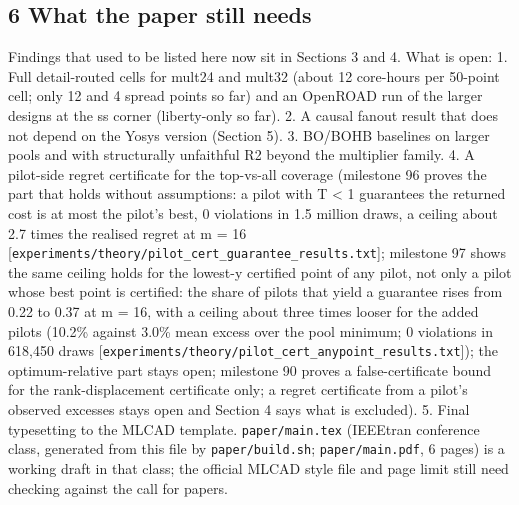 \documentclass[conference]{IEEEtran}
\begin{document}
\hypertarget{what-the-paper-still-needs}{%
\subsection{6 What the paper still
needs}\label{what-the-paper-still-needs}}

Findings that used to be listed here now sit in Sections 3 and 4. What
is open: 1. Full detail-routed cells for mult24 and mult32 (about 12
core-hours per 50-point cell; only 12 and 4 spread points so far) and an
OpenROAD run of the larger designs at the ss corner (liberty-only so
far). 2. A causal fanout result that does not depend on the Yosys
version (Section 5). 3. BO/BOHB baselines on larger pools and with
structurally unfaithful R2 beyond the multiplier family. 4. A pilot-side
regret certificate for the top-vs-all coverage (milestone 96 proves the
part that holds without assumptions: a pilot with T \textless{} 1
guarantees the returned cost is at most the pilot's best, 0 violations
in 1.5 million draws, a ceiling about 2.7 times the realised regret at m
= 16
{[}\texttt{experiments/\allowbreak{}theory/\allowbreak{}pilot\_\allowbreak{}cert\_\allowbreak{}guarantee\_\allowbreak{}results.txt}{]};
milestone 97 shows the same ceiling holds for the lowest-y certified
point of any pilot, not only a pilot whose best point is certified: the
share of pilots that yield a guarantee rises from 0.22 to 0.37 at m =
16, with a ceiling about three times looser for the added pilots (10.2\%
against 3.0\% mean excess over the pool minimum; 0 violations in 618,450
draws
{[}\texttt{experiments/\allowbreak{}theory/\allowbreak{}pilot\_\allowbreak{}cert\_\allowbreak{}anypoint\_\allowbreak{}results.txt}{]});
the optimum-relative part stays open; milestone 90 proves a
false-certificate bound for the rank-displacement certificate only; a
regret certificate from a pilot's observed excesses stays open and
Section 4 says what is excluded). 5. Final typesetting to the MLCAD
template. \texttt{paper/\allowbreak{}main.tex} (IEEEtran conference class, generated
from this file by \texttt{paper/\allowbreak{}build.sh}; \texttt{paper/\allowbreak{}main.pdf}, 6
pages) is a working draft in that class; the official MLCAD style file
and page limit still need checking against the call for papers.
\end{document}
